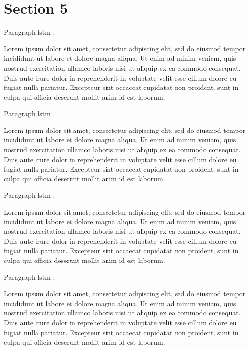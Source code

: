 \section{Section 5}

Paragraph
\gls{lstm} \cite{hochreiter1997lstm-1}
\cite{zeyer2018:asr-attention-1}.

Lorem ipsum dolor sit amet, consectetur adipiscing elit,
sed do eiusmod tempor incididunt ut labore et dolore magna aliqua.
Ut enim ad minim veniam, quis nostrud exercitation ullamco laboris nisi ut aliquip ex ea commodo consequat.
Duis aute irure dolor in reprehenderit in voluptate velit esse cillum dolore eu fugiat nulla pariatur.
Excepteur sint occaecat cupidatat non proident, sunt in culpa qui officia deserunt mollit anim id est laborum.

Paragraph
\gls{lstm} \cite{hochreiter1997lstm-2}
\cite{zeyer2018:asr-attention-2}.

Lorem ipsum dolor sit amet, consectetur adipiscing elit,
sed do eiusmod tempor incididunt ut labore et dolore magna aliqua.
Ut enim ad minim veniam, quis nostrud exercitation ullamco laboris nisi ut aliquip ex ea commodo consequat.
Duis aute irure dolor in reprehenderit in voluptate velit esse cillum dolore eu fugiat nulla pariatur.
Excepteur sint occaecat cupidatat non proident, sunt in culpa qui officia deserunt mollit anim id est laborum.

Paragraph
\gls{lstm} \cite{hochreiter1997lstm-3}
\cite{zeyer2018:asr-attention-3}.

Lorem ipsum dolor sit amet, consectetur adipiscing elit,
sed do eiusmod tempor incididunt ut labore et dolore magna aliqua.
Ut enim ad minim veniam, quis nostrud exercitation ullamco laboris nisi ut aliquip ex ea commodo consequat.
Duis aute irure dolor in reprehenderit in voluptate velit esse cillum dolore eu fugiat nulla pariatur.
Excepteur sint occaecat cupidatat non proident, sunt in culpa qui officia deserunt mollit anim id est laborum.

Paragraph
\gls{lstm} \cite{hochreiter1997lstm-4}
\cite{zeyer2018:asr-attention-4}.

Lorem ipsum dolor sit amet, consectetur adipiscing elit,
sed do eiusmod tempor incididunt ut labore et dolore magna aliqua.
Ut enim ad minim veniam, quis nostrud exercitation ullamco laboris nisi ut aliquip ex ea commodo consequat.
Duis aute irure dolor in reprehenderit in voluptate velit esse cillum dolore eu fugiat nulla pariatur.
Excepteur sint occaecat cupidatat non proident, sunt in culpa qui officia deserunt mollit anim id est laborum.

